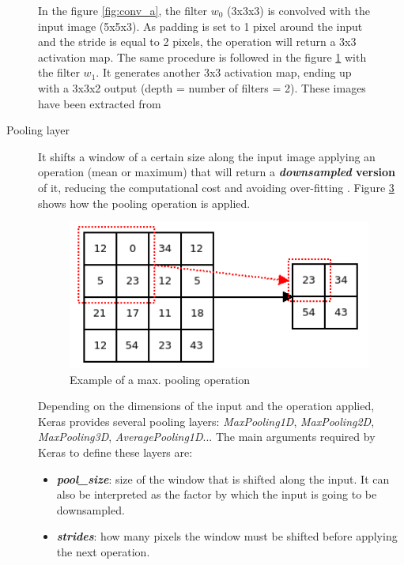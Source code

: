 \begin{description}
\begin{figure}
\begin{subfigure}{0.65\textwidth}
			\caption{}\label{fig:conv_b}
		\end{subfigure}
		\caption[Convolutional layer]{In the figure \ref{fig:conv_a}, the filter $w_0$ (3x3x3) is convolved with the input image (5x5x3). As padding is set to 1 pixel around the input and the stride is equal to 2 pixels, the operation will return a 3x3 activation map. The same procedure is followed in the figure \ref{fig:conv_b} with the filter $w_1$. It generates another 3x3 activation map, ending up with a 3x3x2 output (depth = number of filters = 2). These images have been extracted from \cite{cs231n}}
		\label{fig:convlayer}
	\end{figure}
	
\end{description}

\begin{description}
	\item[{Pooling layer}] It shifts a window of a certain size along the input image applying an operation (mean or maximum) that will return a \textbf{\textit{downsampled} version} of it, reducing the computational cost and avoiding over-fitting \cite{Scherer2010Evaluation}. Figure \ref{fig:pooling} shows how the pooling operation is applied.

	\begin{figure}
		\centering
		\includegraphics[width=10cm, keepaspectratio]{figures/pooling.png}
		\caption{Example of a max. pooling operation}
		\label{fig:pooling}
	\end{figure}
	
	Depending on the dimensions of the input and the operation applied, Keras provides several pooling layers: \textit{MaxPooling1D}, \textit{MaxPooling2D}, \textit{MaxPooling3D}, \textit{AveragePooling1D}... The main arguments required by Keras to define these layers are:
	\begin{itemize}
		\item \textbf{\textit{pool\_size}}: size of the window that is shifted along the input. It can also be interpreted as the factor by which the input is going to be downsampled.
		\item \textbf{\textit{strides}}: how many pixels the window must be shifted before applying the next operation.
	\end{itemize}
\end{description}

